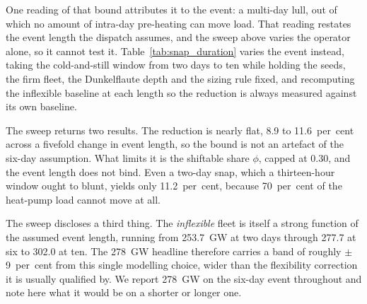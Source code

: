 One reading of that bound attributes it to the event: a multi-day lull, out of which no
amount of intra-day pre-heating can move load. That reading restates the event length the
dispatch assumes, and the sweep above varies the operator alone, so it cannot test it.
Table~\ref{tab:snap_duration}
varies the event instead, taking the cold-and-still window from two days to ten while
holding the seeds, the firm fleet, the Dunkelflaute depth and the sizing rule fixed, and
recomputing the inflexible baseline at each length so the reduction is always measured
against its own baseline.



The sweep returns two results. The reduction is nearly flat, 8.9 to 11.6~per~cent across
a fivefold change in event length, so the bound is not an artefact of the six-day
assumption. What limits it is the shiftable share $\phi$, capped at 0.30, and the event
length does not bind. Even a two-day snap, which a thirteen-hour window ought to blunt,
yields only 11.2~per~cent, because 70~per~cent of the heat-pump load cannot move at all.

The sweep discloses a third thing. The \emph{inflexible} fleet is
itself a strong function of the assumed event length, running from 253.7~GW at two days
through 277.7 at six to 302.0 at ten. The 278~GW headline therefore carries a band of
roughly $\pm$9~per~cent from this single modelling choice, wider than the flexibility
correction it is usually qualified by. We report 278~GW on the six-day event throughout
and note here what it would be on a shorter or longer one.

